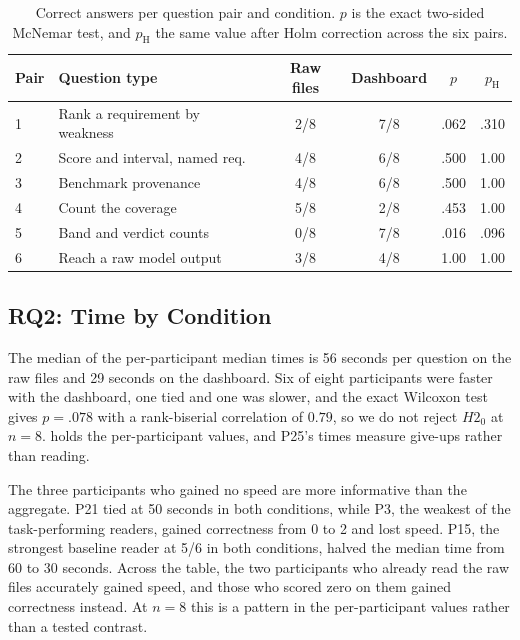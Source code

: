 \documentclass[10pt,conference]{IEEEtran}
\newcommand{\tblsetup}{%
  \footnotesize%
  \setlength{\tabcolsep}{3pt}%
  \renewcommand{\arraystretch}{1.02}%
}
\begin{document}
\begin{table}[t]
  \caption{Correct answers per question pair and condition. $p$ is the exact two-sided McNemar test, and $p_{\mathrm{H}}$ the same value after Holm correction across the six pairs.}
  \label{tab:pairs}
  \centering
  \tblsetup
  \begin{tabularx}{\columnwidth}{@{}l X c c c c@{}}
    \toprule
    Pair & Question type & Raw files & Dashboard & $p$ & $p_{\mathrm{H}}$ \\
    \midrule
    1 & Rank a requirement by weakness & 2/8 & 7/8 & .062 & .310 \\
    2 & Score and interval, named req. & 4/8 & 6/8 & .500 & 1.00 \\
    3 & Benchmark provenance & 4/8 & 6/8 & .500 & 1.00 \\
    4 & Count the coverage & 5/8 & 2/8 & .453 & 1.00 \\
    5 & Band and verdict counts & 0/8 & 7/8 & .016 & .096 \\
    6 & Reach a raw model output & 3/8 & 4/8 & 1.00 & 1.00 \\
    \bottomrule
  \end{tabularx}
\end{table}

\subsection{RQ2: Time by Condition}
The median of the per-participant median times is 56 seconds per question on the raw files and 29 seconds on the dashboard.
Six of eight participants were faster with the dashboard, one tied and one was slower, and the exact Wilcoxon test gives $p = .078$ with a rank-biserial correlation of $0.79$, so we do not reject $H2_0$ at $n = 8$.
 holds the per-participant values, and P25's times measure give-ups rather than reading.

The three participants who gained no speed are more informative than the aggregate.
P21 tied at 50 seconds in both conditions, while P3, the weakest of the task-performing readers, gained correctness from 0 to 2 and lost speed.
P15, the strongest baseline reader at 5/6 in both conditions, halved the median time from 60 to 30 seconds.
Across the table, the two participants who already read the raw files accurately gained speed, and those who scored zero on them gained correctness instead.
At $n = 8$ this is a pattern in the per-participant values rather than a tested contrast.
\end{document}
